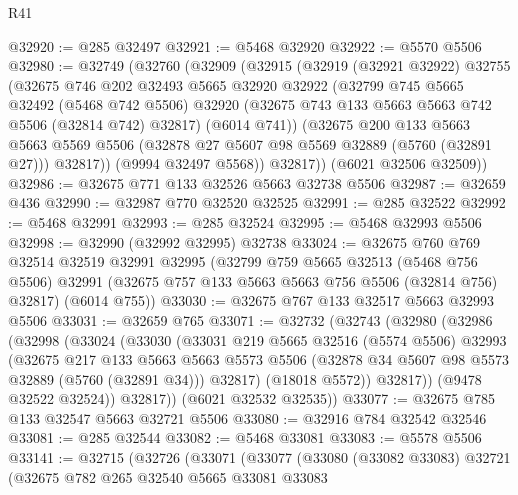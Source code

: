 \begin{lexlean}{R41}
\begin{coremodule}
@32920 := @285 @32497
@32921 := @5468 @32920
@32922 := @5570 @5506
@32980 := @32749
    (@32760
      (@32909
        (@32915
          (@32919
            (@32921 @32922)
            @32755
            (@32675
              @746
              @202
              @32493
              @5665
              @32920
              @32922
              (@32799
                @745
                @5665
                @32492
                (@5468 @742 @5506)
                @32920
                (@32675 @743 @133 @5663 @5663 @742 @5506 (@32814 @742) @32817)
                (@6014 @741))
              (@32675
                @200
                @133
                @5663
                @5663
                @5569
                @5506
                (@32878 @27 @5607 @98 @5569 @32889 (@5760 (@32891 @27)))
                @32817))
            (@9994 @32497 @5568))
          @32817))
      (@6021 @32506 @32509))
@32986 := @32675 @771 @133 @32526 @5663 @32738 @5506
@32987 := @32659 @436
@32990 := @32987 @770 @32520 @32525
@32991 := @285 @32522
@32992 := @5468 @32991
@32993 := @285 @32524
@32995 := @5468 @32993 @5506
@32998 := @32990 (@32992 @32995) @32738
@33024 := @32675
    @760
    @769
    @32514
    @32519
    @32991
    @32995
    (@32799
      @759
      @5665
      @32513
      (@5468 @756 @5506)
      @32991
      (@32675 @757 @133 @5663 @5663 @756 @5506 (@32814 @756) @32817)
      (@6014 @755))
@33030 := @32675 @767 @133 @32517 @5663 @32993 @5506
@33031 := @32659 @765
@33071 := @32732
    (@32743
      (@32980
        (@32986
          (@32998
            (@33024
              (@33030
                (@33031
                  @219
                  @5665
                  @32516
                  (@5574 @5506)
                  @32993
                  (@32675
                    @217
                    @133
                    @5663
                    @5663
                    @5573
                    @5506
                    (@32878 @34 @5607 @98 @5573 @32889 (@5760 (@32891 @34)))
                    @32817)
                  (@18018 @5572))
                @32817))
            (@9478 @32522 @32524))
          @32817))
      (@6021 @32532 @32535))
@33077 := @32675 @785 @133 @32547 @5663 @32721 @5506
@33080 := @32916 @784 @32542 @32546
@33081 := @285 @32544
@33082 := @5468 @33081
@33083 := @5578 @5506
@33141 := @32715
    (@32726
      (@33071
        (@33077
          (@33080
            (@33082 @33083)
            @32721
            (@32675
              @782
              @265
              @32540
              @5665
              @33081
              @33083

\end{coremodule}
\end{lexlean}
